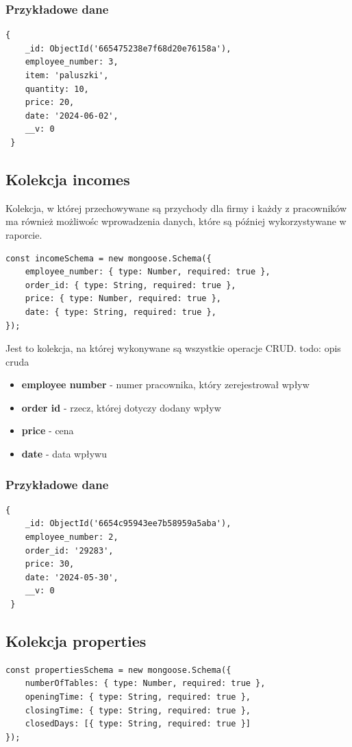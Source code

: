 \documentclass[12pt]{article}
\begin{document}
\subsubsection{Przykładowe dane}
\begin{lstlisting}[]
 {
    _id: ObjectId('665475238e7f68d20e76158a'),
    employee_number: 3,
    item: 'paluszki',
    quantity: 10,
    price: 20,
    date: '2024-06-02',
    __v: 0
 }
\end{lstlisting}

\newpage
\begin{samepage}
\subsection{Kolekcja incomes}
Kolekcja, w której przechowywane są przychody dla firmy i każdy z pracowników ma również możliwośc wprowadzenia danych, które są później wykorzystywane w raporcie.

\begin{lstlisting}[caption={Incomes}]
const incomeSchema = new mongoose.Schema({
    employee_number: { type: Number, required: true },
    order_id: { type: String, required: true },
    price: { type: Number, required: true },
    date: { type: String, required: true },
});
\end{lstlisting}
Jest to kolekcja, na której wykonywane są wszystkie operacje CRUD.
todo: opis cruda
\end{samepage}

\begin{itemize}
	\item \textbf{employee number} - numer pracownika, który zerejestrował wpływ
	\item \textbf{order id} - rzecz, której dotyczy dodany wpływ
	\item \textbf{price} - cena
	\item \textbf{date} - data wpływu
\end{itemize}

\subsubsection{Przykładowe dane}
\begin{lstlisting}[]
 {
    _id: ObjectId('6654c95943ee7b58959a5aba'),
    employee_number: 2,
    order_id: '29283',
    price: 30,
    date: '2024-05-30',
    __v: 0
 }
\end{lstlisting}

\newpage
\begin{samepage}
\subsection{Kolekcja properties}

\begin{lstlisting}[caption={Properties}]
const propertiesSchema = new mongoose.Schema({
    numberOfTables: { type: Number, required: true },
    openingTime: { type: String, required: true },
    closingTime: { type: String, required: true },
    closedDays: [{ type: String, required: true }]
});
\end{lstlisting}
\end{samepage}
\end{document}
